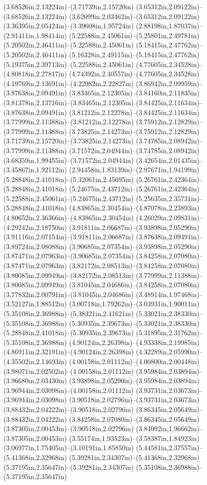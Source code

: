 (3.68526in,2.13224in)--(3.71739in,2.15720in) (3.65312in,2.09122in)--(3.68526in,2.13224in) (3.62099in,2.03462in)--(3.65312in,2.09122in) (3.36395in,2.05424in)--(3.39608in,1.95724in) (2.88198in,1.87037in)--(2.91411in,1.98414in) (5.22588in,2.45061in)--(5.25801in,2.49781in) (5.20502in,2.46411in)--(5.22588in,2.45061in) (5.18415in,2.47762in)--(5.20502in,2.46411in) (5.16328in,2.49115in)--(5.18415in,2.47762in) (5.19375in,2.39713in)--(5.22588in,2.45061in) (4.77605in,2.34528in)--(4.80818in,2.27817in) (4.74392in,2.40557in)--(4.77605in,2.34528in) (4.19769in,2.13691in)--(4.22982in,2.22827in) (3.86942in,2.09959in)--(3.87638in,2.09491in) (3.83465in,2.12305in)--(3.84160in,2.11835in) (3.81378in,2.13716in)--(3.83465in,2.12305in) (3.84425in,2.11634in)--(3.87638in,2.09491in) (3.81212in,2.12278in)--(3.84425in,2.11634in) (3.77999in,2.11388in)--(3.81212in,2.12278in) (3.75912in,2.12829in)--(3.77999in,2.11388in) (3.73825in,2.14273in)--(3.75912in,2.12829in) (3.71739in,2.15720in)--(3.73825in,2.14273in) (3.74785in,2.08942in)--(3.77999in,2.11388in) (3.71572in,2.04944in)--(3.74785in,2.08942in) (3.68359in,1.99455in)--(3.71572in,2.04944in) (3.42654in,2.01435in)--(3.45867in,1.92112in) (2.94458in,1.83139in)--(2.97671in,1.94199in) (5.28848in,2.41018in)--(5.32061in,2.45695in) (5.26761in,2.42364in)--(5.28848in,2.41018in) (5.24675in,2.43712in)--(5.26761in,2.42364in) (5.22588in,2.45061in)--(5.24675in,2.43712in) (5.25635in,2.35731in)--(5.28848in,2.41018in) (4.83865in,2.30454in)--(4.87078in,2.23893in) (4.80652in,2.36366in)--(4.83865in,2.30454in) (4.26029in,2.09831in)--(4.29242in,2.18750in) (3.91811in,2.06687in)--(3.93898in,2.05290in) (3.91116in,2.07154in)--(3.91811in,2.06687in) (3.87638in,2.09491in)--(3.89724in,2.08088in) (3.90685in,2.07354in)--(3.93898in,2.05290in) (3.87471in,2.07963in)--(3.90685in,2.07354in) (3.84258in,2.07080in)--(3.87471in,2.07963in) (3.82172in,2.08513in)--(3.84258in,2.07080in) (3.80085in,2.09949in)--(3.82172in,2.08513in) (3.77999in,2.11388in)--(3.80085in,2.09949in) (3.81045in,2.04686in)--(3.84258in,2.07080in) (3.77832in,2.00791in)--(3.81045in,2.04686in) (3.48914in,1.97468in)--(3.52127in,1.88512in) (3.00718in,1.79262in)--(3.03931in,1.90011in) (5.35108in,2.36988in)--(5.38321in,2.41621in) (5.33021in,2.38330in)--(5.35108in,2.36988in) (5.30935in,2.39673in)--(5.33021in,2.38330in) (5.28848in,2.41018in)--(5.30935in,2.39673in) (5.31895in,2.31762in)--(5.35108in,2.36988in) (4.90124in,2.26398in)--(4.93338in,2.19985in) (4.86911in,2.32191in)--(4.90124in,2.26398in) (4.32289in,2.05990in)--(4.35502in,2.14693in) (4.00158in,2.01112in)--(4.00800in,2.00448in) (3.98071in,2.02502in)--(4.00158in,2.01112in) (3.95984in,2.03894in)--(3.96680in,2.03430in) (3.93898in,2.05290in)--(3.95984in,2.03894in) (3.96944in,2.03098in)--(4.00158in,2.01112in) (3.93731in,2.03673in)--(3.96944in,2.03098in) (3.90518in,2.02796in)--(3.93731in,2.03673in) (3.88432in,2.04222in)--(3.90518in,2.02796in) (3.86345in,2.05649in)--(3.88432in,2.04222in) (3.84258in,2.07080in)--(3.86345in,2.05649in) (3.87305in,2.00453in)--(3.90518in,2.02796in) (3.84092in,1.96662in)--(3.87305in,2.00453in) (3.55174in,1.93523in)--(3.58387in,1.84923in) (3.06977in,1.75405in)--(3.10191in,1.85850in) (5.44581in,2.37557in)--(5.41368in,2.32968in) (5.39281in,2.34307in)--(5.41368in,2.32968in) (5.37195in,2.35647in)--(5.39281in,2.34307in) (5.35108in,2.36988in)--(5.37195in,2.35647in) 